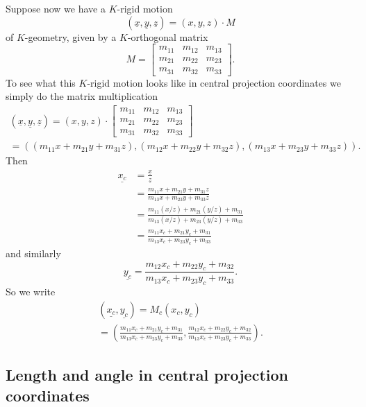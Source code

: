 \documentclass{ximera}
\begin{document}
Suppose now we have a $K$-rigid motion%
\[
\left(  \underline{x},\underline{y},\underline{z}\right)  =\left(
x,y,z\right)  \cdot M
\]
of $K$-geometry, given by a $K$-orthogonal matrix%
\[
M=\begin{bmatrix}
m_{11} & m_{12} & m_{13}\\
m_{21} & m_{22} & m_{23}\\
m_{31} & m_{32} & m_{33}%
\end{bmatrix} .
\]
To see what this $K$-rigid motion looks like in central projection coordinates
we simply do the matrix multiplication%
\begin{gather*}
\left(  \underline{x},\underline{y},\underline{z}\right)  =\left(
x,y,z\right)  \cdot\begin{bmatrix}
m_{11} & m_{12} & m_{13}\\
m_{21} & m_{22} & m_{23}\\
m_{31} & m_{32} & m_{33}%
\end{bmatrix}\\
=\left(  \left(  m_{11}x+m_{21}y+m_{31}z\right)  ,\left(  m_{12}%
x+m_{22}y+m_{32}z\right)  ,\left(  m_{13}x+m_{23}y+m_{33}z\right)  \right)  .
\end{gather*}
Then%
\begin{align}
\underline{x_{c}}  &  =\frac{\underline{x}}{\underline{z}}\label{77}\\
&  =\frac{m_{11}x+m_{21}y+m_{31}z}{m_{13}x+m_{23}y+m_{33}z}\nonumber\\
&  =\frac{m_{11}\left(  x/z\right)  +m_{21}\left(  y/z\right)  +m_{31}}%
{m_{13}\left(  x/z\right)  +m_{23}\left(  y/z\right)  +m_{33}}\nonumber\\
&  =\frac{m_{11}x_{c}+m_{21}y_{c}+m_{31}}{m_{13}x_{c}+m_{23}y_{c}+m_{33}%
}\nonumber
\end{align}
and similarly%
\[
\underline{y_{c}}=\frac{m_{12}x_{c}+m_{22}y_{c}+m_{32}}{m_{13}x_{c}%
+m_{23}y_{c}+m_{33}}.
\]
So we write%
\begin{gather*}
\left(  \underline{x_{c}},\underline{y_{c}}\right)  =M_{c}\left(  x_{c}%
,y_{c}\right) \\
=\left(  \frac{m_{11}x_{c}+m_{21}y_{c}+m_{31}}{m_{13}x_{c}+m_{23}y_{c}+m_{33}%
},\frac{m_{12}x_{c}+m_{22}y_{c}+m_{32}}{m_{13}x_{c}+m_{23}y_{c}+m_{33}%
}\right)  .
\end{gather*}




\subsection*{Length and angle in central projection coordinates}
\end{document}
